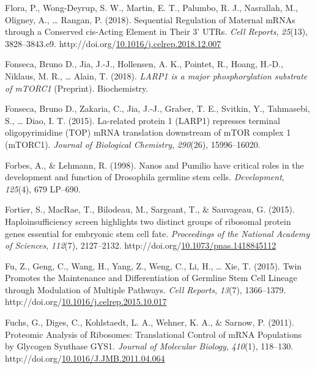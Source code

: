 \documentclass[12pt,oneside]{reedthesis}
\newlength{\cslhangindent}
\newenvironment{CSLReferences}[2] %
 {%
  \setlength{\parindent}{0pt}
  \ifodd #1 \everypar{\setlength{\hangindent}{\cslhangindent}}\ignorespaces\fi
  \ifnum #2 > 0
  \setlength{\parskip}{#2\baselineskip}
  \fi
 }%
 {}
\begin{document}
\begin{CSLReferences}{1}{0}
\leavevmode{}%
Flora, P., Wong-Deyrup, S. W., Martin, E. T., Palumbo, R. J., Nasrallah, M., Oligney, A., \ldots{} Rangan, P. (2018). Sequential {Regulation} of {Maternal mRNAs} through a {Conserved} cis-{Acting Element} in {Their} 3' {UTRs}. \emph{Cell Reports}, \emph{25}(13), 3828--3843.e9. http://doi.org/\href{https://doi.org/10.1016/j.celrep.2018.12.007}{10.1016/j.celrep.2018.12.007}

\leavevmode{}%
Fonseca, Bruno D., Jia, J.-J., Hollensen, A. K., Pointet, R., Hoang, H.-D., Niklaus, M. R., \ldots{} Alain, T. (2018). \emph{{LARP1} is a major phosphorylation substrate of {mTORC1}} (Preprint). {Biochemistry}.

\leavevmode{}%
Fonseca, Bruno D., Zakaria, C., Jia, J.-J., Graber, T. E., Svitkin, Y., Tahmasebi, S., \ldots{} Diao, I. T. (2015). La-related protein 1 ({LARP1}) represses terminal oligopyrimidine ({TOP}) {mRNA} translation downstream of {mTOR} complex 1 ({mTORC1}). \emph{Journal of Biological Chemistry}, \emph{290}(26), 15996--16020.

\leavevmode{}%
Forbes, A., \& Lehmann, R. (1998). Nanos and {Pumilio} have critical roles in the development and function of {Drosophila} germline stem cells. \emph{Development}, \emph{125}(4), 679 LP--690.

\leavevmode{}%
Fortier, S., MacRae, T., Bilodeau, M., Sargeant, T., \& Sauvageau, G. (2015). Haploinsufficiency screen highlights two distinct groups of ribosomal protein genes essential for embryonic stem cell fate. \emph{Proceedings of the National Academy of Sciences}, \emph{112}(7), 2127--2132. http://doi.org/\href{https://doi.org/10.1073/pnas.1418845112}{10.1073/pnas.1418845112}

\leavevmode{}%
Fu, Z., Geng, C., Wang, H., Yang, Z., Weng, C., Li, H., \ldots{} Xie, T. (2015). Twin {Promotes} the {Maintenance} and {Differentiation} of {Germline Stem Cell Lineage} through {Modulation} of {Multiple Pathways}. \emph{Cell Reports}, \emph{13}(7), 1366--1379. http://doi.org/\href{https://doi.org/10.1016/j.celrep.2015.10.017}{10.1016/j.celrep.2015.10.017}

\leavevmode{}%
Fuchs, G., Diges, C., Kohlstaedt, L. A., Wehner, K. A., \& Sarnow, P. (2011). Proteomic {Analysis} of {Ribosomes}: {Translational Control} of {mRNA Populations} by {Glycogen Synthase GYS1}. \emph{Journal of Molecular Biology}, \emph{410}(1), 118--130. http://doi.org/\href{https://doi.org/10.1016/J.JMB.2011.04.064}{10.1016/J.JMB.2011.04.064}


\end{CSLReferences}
\end{document}
